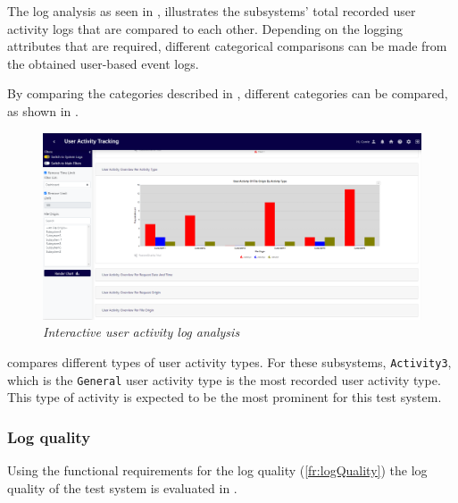 \clearpage

The log analysis as seen in , illustrates the subsystems' total recorded user activity logs that are compared to each other. Depending on the logging attributes that are required, different categorical comparisons can be made from the obtained user-based event logs. \par By comparing the categories described in , different categories can be compared, as shown in . 

\begin{figure}[!htb]
	\centering %
	\includegraphics[width=0.99\linewidth]{img/ch3/analysis/UAT_menu_activities.png}
	\caption[Interactive user activity log analysis]
	{\textit{Interactive user activity log analysis}}\label{fig:ch3_UAT_menuActivities}
\end{figure}

 compares different types of user activity types. For these subsystems, \texttt{Activity3}, which is the \texttt{General} user activity type is the most recorded user activity type. This type of activity is expected to be the most prominent for this test system. 

\clearpage

\subsubsection{Log quality}
Using the functional requirements for the log quality (\ref{fr:logQuality}) the log quality of the test system is evaluated in .

